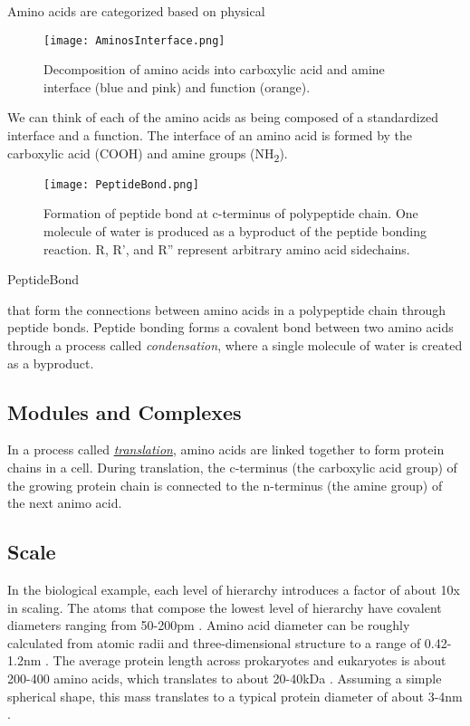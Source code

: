 {Amino acids are categorized based on physical \cite{aminoAcidsRef}

\begin{figure}
  \texttt{[image: AminosInterface.png]}
  \caption{Decomposition of amino acids into carboxylic acid and amine interface (blue and pink) and function (orange).}
  \label{fig:AminosInterface}
\end{figure}

We can think of each of the amino acids as being composed of a standardized interface and a function.  The interface of an amino acid is formed by the carboxylic acid (COOH) and amine groups (NH\textsubscript{2}).  


\begin{figure}
  \texttt{[image: PeptideBond.png]}
  \caption{Formation of peptide bond at c-terminus of polypeptide chain. One molecule of water is produced as a byproduct of the peptide bonding reaction.  R, R', and R'' represent arbitrary amino acid sidechains.}
  \label{fig:PeptideBond}
\end{figure}
PeptideBond


 that form the connections between amino acids in a polypeptide chain through peptide bonds.  Peptide bonding forms a covalent bond between two amino acids through a process called \textit{condensation}, where a single molecule of water is created as a byproduct.\\
 
 \subsection{Modules and Complexes}

In a process called \href{https://en.wikipedia.org/wiki/Translation_%28biology%29}{\textit{translation}}, amino acids are linked together to form protein chains in a cell.  During translation, the c-terminus (the carboxylic acid group) of the growing protein chain is connected to the n-terminus (the amine group) of the next animo acid.

\subsection{Scale}

In the biological example, each level of hierarchy introduces a factor of about 10x in scaling.  The atoms that compose the lowest level of hierarchy have covalent diameters ranging from 50-200pm \cite{Slater1993}.  Amino acid diameter can be roughly calculated from atomic radii and three-dimensional structure to a range of 0.42-1.2nm \cite{Pool2003}.  The average protein length across prokaryotes and eukaryotes is about 200-400 amino acids, which translates to about 20-40kDa \cite{Brocchieri2005}.  Assuming a simple spherical shape, this mass translates to a typical protein diameter of about 3-4nm \cite{Erickson2009}.

}
